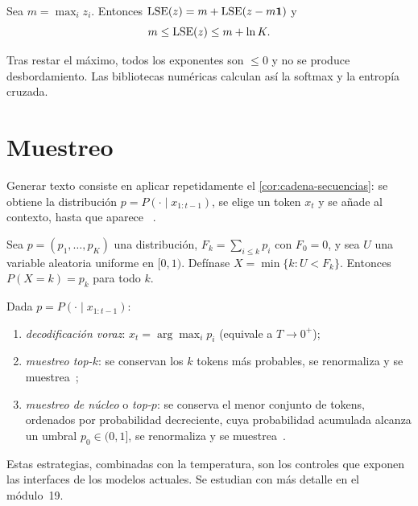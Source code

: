 \begin{proposicion}\label{prop:lse}
Sea $m=\max_i z_i$. Entonces $\operatorname{LSE}(z)=m+\operatorname{LSE}(z-m\mathbf{1})$ y
\[
m\le\operatorname{LSE}(z)\le m+\ln K.
\]
\end{proposicion}

Tras restar el máximo, todos los exponentes son $\le 0$ y no se produce desbordamiento. Las bibliotecas numéricas calculan así la softmax y la entropía cruzada.

\section{Muestreo}

Generar texto consiste en aplicar repetidamente el \cref{cor:cadena-secuencias}: se obtiene la distribución $p=P(\cdot\mid x_{1:t-1})$, se elige un token $x_t$ y se añade al contexto, hasta que aparece \fin~\cite[§3.4]{jm3}.

\begin{proposicion}\label{prop:muestreo}
Sea $p=(p_1,\dots,p_K)$ una distribución, $F_k=\sum_{i\le k}p_i$ con $F_0=0$, y sea $U$ una variable aleatoria uniforme en $[0,1)$. Defínase $X=\min\{k: U<F_k\}$. Entonces $P(X=k)=p_k$ para todo $k$.
\end{proposicion}

\begin{definicion}
Dada $p=P(\cdot\mid x_{1:t-1})$:
\begin{enumerate}
  \item \emph{decodificación voraz}: $x_t=\arg\max_i p_i$ (equivale a $T\to 0^{+}$);
  \item \emph{muestreo top-$k$}: se conservan los $k$ tokens más probables, se renormaliza y se muestrea~\cite{fan};
  \item \emph{muestreo de núcleo} o \emph{top-$p$}: se conserva el menor conjunto de tokens, ordenados por probabilidad decreciente, cuya probabilidad acumulada alcanza un umbral $p_0\in(0,1]$, se renormaliza y se muestrea~\cite{holtzman}.
\end{enumerate}
\end{definicion}

Estas estrategias, combinadas con la temperatura, son los controles que exponen las interfaces de los modelos actuales. Se estudian con más detalle en el módulo~19.

